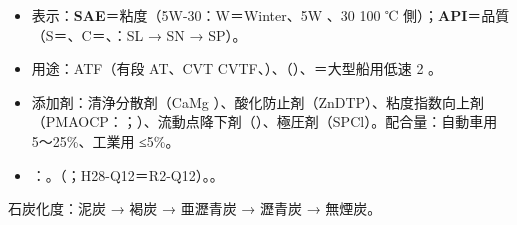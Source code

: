 \begin{itemize}
\item{} 表示：\textbf{SAE}＝粘度（5W-30：W＝Winter、5W 、30  100 ℃ 側）；\textbf{API}＝品質（S＝、C＝、：SL → SN → SP）。
\item{} 用途：ATF（有段 AT、CVT  CVTF、）、（）、＝大型船用低速 2 。
\item{} 添加剤：清浄分散剤（CaMg ）、酸化防止剤（ZnDTP）、粘度指数向上剤（PMAOCP：；\textbf{}）、流動点降下剤（）、極圧剤（SPCl）。配合量：自動車用 5〜25\%、工業用 ≤5\%。
\item{} ：。（\hl{}；H28-Q12＝R2-Q12）。。
\end{itemize}
石炭化度：泥炭 → 褐炭 → 亜瀝青炭 → 瀝青炭 → 無煙炭。


